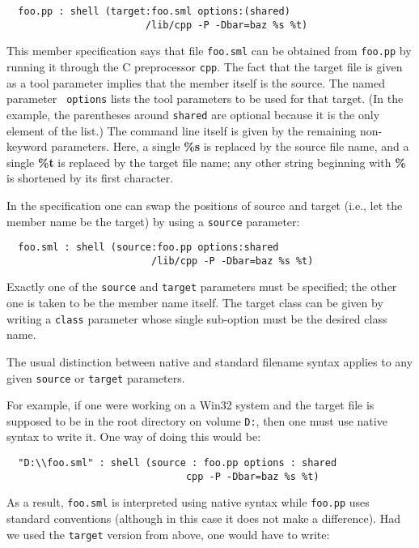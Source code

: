 \documentclass[titlepage,letterpaper]{article}
\begin{document}
\begin{verbatim}
  foo.pp : shell (target:foo.sml options:(shared)
                        /lib/cpp -P -Dbar=baz %s %t)
\end{verbatim}

This member specification says that file {\tt foo.sml} can be obtained
from {\tt foo.pp} by running it through the C preprocessor {\tt cpp}.
The fact that the target file is given as a tool parameter implies
that the member itself is the source.  The named parameter {\tt
options} lists the tool parameters to be used for that target. (In the
example, the parentheses around {\tt shared} are optional because it
is the only element of the list.) The command line itself is given by
the remaining non-keyword parameters.  Here, a single {\bf \%s} is
replaced by the source file name, and a single {\bf \%t} is replaced
by the target file name; any other string beginning with {\bf \%} is
shortened by its first character.

In the specification one can swap the positions of source and target
(i.e., let the member name be the target) by using a {\tt source}
parameter:

\begin{verbatim}
  foo.sml : shell (source:foo.pp options:shared
                         /lib/cpp -P -Dbar=baz %s %t)
\end{verbatim}

Exactly one of the {\tt source} and {\tt target} parameters must be
specified; the other one is taken to be the member name itself.  The
target class can be given by writing a {\tt class} parameter whose
single sub-option must be the desired class name.

The usual distinction between native and standard filename syntax
applies to any given {\tt source} or {\tt target} parameters.

For example, if one were working on a Win32 system and the target file
is supposed to be in the root directory on volume {\tt D:},
then one must use native syntax to write it.  One way of doing this
would be:

\begin{verbatim}
  "D:\\foo.sml" : shell (source : foo.pp options : shared
                               cpp -P -Dbar=baz %s %t)
\end{verbatim}

\noindent As a result, {\tt foo.sml} is interpreted using native
syntax while {\tt foo.pp} uses standard conventions (although in this
case it does not make a difference).  Had we used the {\tt target}
version from above, one would have to write:
\end{document}
